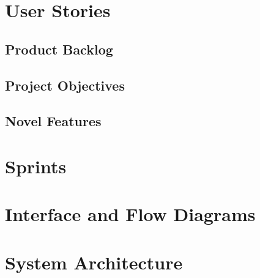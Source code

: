 \documentclass[12pt]{article}
\begin{document}
\section{User Stories}
\subsection{Product Backlog}
\subsection{Project Objectives}
\subsection{Novel Features}

\section{Sprints}

\section{Interface and Flow Diagrams}

\section{System Architecture}



\end{document}
